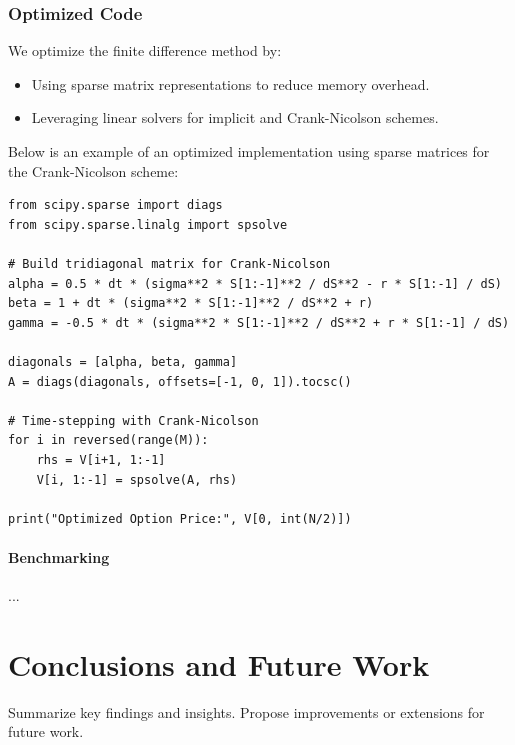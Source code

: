 \documentclass[12pt,a4paper]{report}
\begin{document}
\subsection{Optimized Code}
We optimize the finite difference method by:
\begin{itemize}
    \item Using sparse matrix representations to reduce memory overhead.
    \item Leveraging linear solvers for implicit and Crank-Nicolson schemes.
\end{itemize}

Below is an example of an optimized implementation using sparse matrices for the Crank-Nicolson scheme:

\begin{tcolorbox}[colframe=green!50!black, colback=green!5, title=Crank-Nicolson with Sparse Matrices]
\begin{verbatim}
from scipy.sparse import diags
from scipy.sparse.linalg import spsolve

# Build tridiagonal matrix for Crank-Nicolson
alpha = 0.5 * dt * (sigma**2 * S[1:-1]**2 / dS**2 - r * S[1:-1] / dS)
beta = 1 + dt * (sigma**2 * S[1:-1]**2 / dS**2 + r)
gamma = -0.5 * dt * (sigma**2 * S[1:-1]**2 / dS**2 + r * S[1:-1] / dS)

diagonals = [alpha, beta, gamma]
A = diags(diagonals, offsets=[-1, 0, 1]).tocsc()

# Time-stepping with Crank-Nicolson
for i in reversed(range(M)):
    rhs = V[i+1, 1:-1]
    V[i, 1:-1] = spsolve(A, rhs)

print("Optimized Option Price:", V[0, int(N/2)])
\end{verbatim}
\end{tcolorbox}

\subsubsection{Benchmarking}
...


\chapter{Conclusions and Future Work}
Summarize key findings and insights. Propose improvements or extensions for future work.
\end{document}
